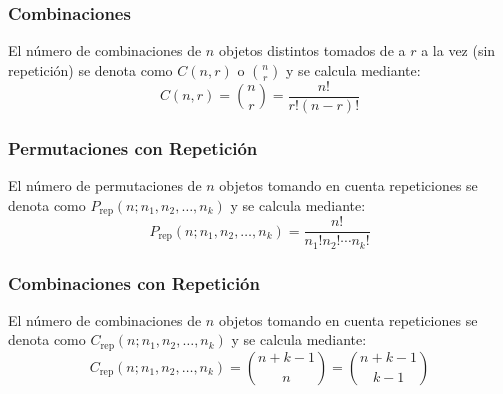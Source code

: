 \subsubsection{Combinaciones}
El número de combinaciones de $n$ objetos distintos tomados de a $r$ a la vez (sin repetición) se denota como $C(n, r)$ o $\binom{n}{r}$ y se calcula mediante:
\[ C(n, r) = \binom{n}{r} = \frac{n!}{r!(n - r)!} \]

\subsubsection{Permutaciones con Repetición}
El número de permutaciones de $n$ objetos tomando en cuenta repeticiones se denota como $P_{\text{rep}}(n; n_1, n_2, \ldots, n_k)$ y se calcula mediante:
\[ P_{\text{rep}}(n; n_1, n_2, \ldots, n_k) = \frac{n!}{n_1!n_2!\cdots n_k!} \]

\subsubsection{Combinaciones con Repetición}
El número de combinaciones de $n$ objetos tomando en cuenta repeticiones se denota como $C_{\text{rep}}(n; n_1, n_2, \ldots, n_k)$ y se calcula mediante:
\[ C_{\text{rep}}(n; n_1, n_2, \ldots, n_k) = \binom{n + k - 1}{n} = \binom{n + k - 1}{k - 1} \]

